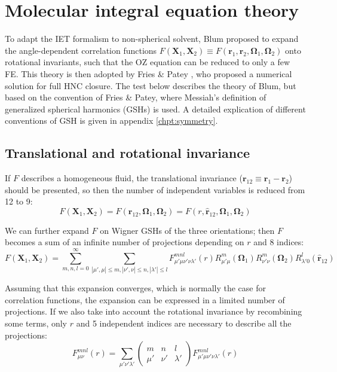 \section{Molecular integral equation theory\label{sec:Angular-dependent-iem}}

To adapt the \acs{IET} formalism to non-spherical solvent, Blum \citep{Blum_I,Blum_II,blum_III}
proposed to expand the angle-dependent correlation functions $F(\mathbf{X}_{1},\mathbf{X}_{2})\equiv F(\mathbf{r}_{1},\mathbf{r}_{2},\mathbf{\Omega}_{1},\mathbf{\Omega}_{2})$
onto rotational invariants, such that the \acs{OZ} equation can be
reduced to only a few \acs{FE}. This theory is then adopted by Fries
\& Patey \citep{Fries_Patey_1985}, who proposed a numerical solution
for full \acs{HNC} closure. The test below describes the theory of
Blum, but based on the convention of Fries \& Patey, where Messiah's
definition of generalized spherical harmonics (\acs{GSH}s) is used.
A detailed explication of different conventions of \acs{GSH} is given
in appendix \ref{chpt:symmetry}.

\subsection{Translational and rotational invariance}

If $F$ describes a homogeneous fluid, the translational invariance
($\mathbf{r}_{12}\equiv\mathbf{r}_{1}-\mathbf{r}_{2}$) should be
presented, so then the number of independent variables is reduced from
12 to 9:
\begin{equation}
F(\mathbf{X}_{1},\mathbf{X}_{2})=F(\mathbf{r}_{12},\mathbf{\Omega}_{1},\mathbf{\Omega}_{2})=F(r,\hat{\mathbf{r}}_{12},\mathbf{\Omega}_{1},\mathbf{\Omega}_{2})\label{eq:miet-def-func}
\end{equation}

We can further expand $F$ on Wigner \acs{GSH}s of the three orientations;
then $F$ becomes a sum of an infinite number of projections depending
on $r$ and 8 indices:
\begin{equation}
F(\mathbf{X}_{1},\mathbf{X}_{2})=\sum_{m,n,l=0}^{\infty}\sum_{\left|\mu',\mu\right|\leq m,\left|\nu',\nu\right|\leq n,\left|\lambda'\right|\leq l}F_{\mu'\mu\nu'\nu\lambda'}^{mnl}(r)R_{\mu'\mu}^{m}(\mathbf{\Omega}_{1})R_{\nu'\nu}^{m}(\mathbf{\Omega}_{2})R_{\lambda'0}^{l}(\hat{\mathbf{r}}_{12})
\end{equation}

Assuming that this expansion converges, which is normally the case
for correlation functions, the expansion can be expressed in a limited
number of projections. If we also take into account the rotational
invariance by recombining some terms, only $r$ and 5 independent indices
are necessary to describe all the projections:
\begin{equation}
F_{\mu\nu}^{mnl}(r)=\sum_{\mu'\nu'\lambda'}\left(\begin{array}{ccc}
m & n & l\\
\mu' & \nu' & \lambda'
\end{array}\right)F_{\mu'\mu\nu'\nu\lambda'}^{mnl}(r)
\end{equation}

